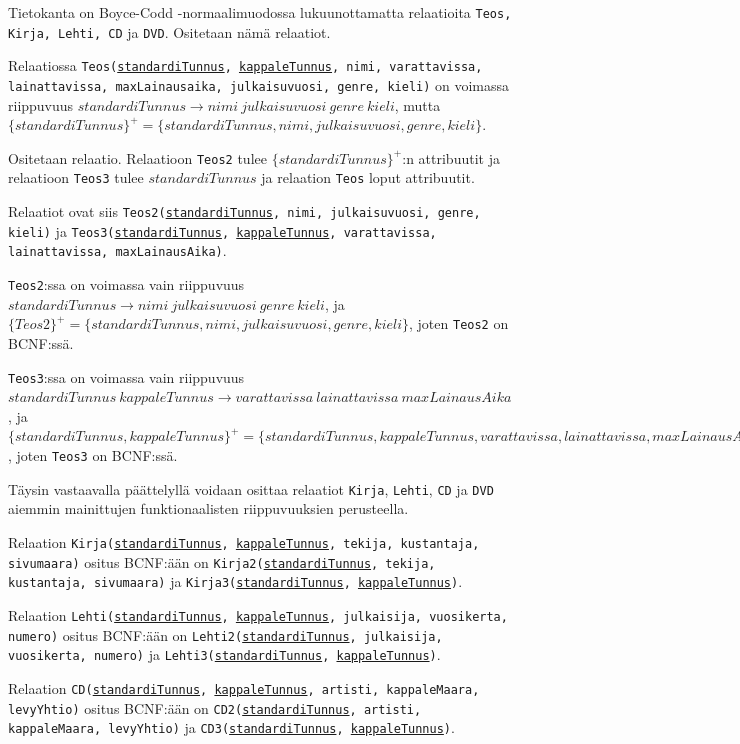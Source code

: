 \documentclass[12pt,titlepage] {article}
\begin{document}
Tietokanta on Boyce-Codd -normaalimuodossa lukuunottamatta relaatioita \texttt{Teos, Kirja, Lehti, CD} ja \texttt{DVD}. Ositetaan nämä relaatiot.

Relaatiossa \texttt{Teos(\underline{standardiTunnus}, \underline{kappaleTunnus}, nimi, varattavissa, lainattavissa, maxLainausaika, julkaisuvuosi, genre, kieli)} on voimassa riippuvuus $standardiTunnus \rightarrow nimi\ julkaisuvuosi\ genre\ kieli$, mutta $\{standardiTunnus\}^+ = \{standardiTunnus, nimi, julkaisuvuosi, genre, kieli\}$.

Ositetaan relaatio. Relaatioon \texttt{Teos2} tulee $\{standardiTunnus\}^+$:n attribuutit ja relaatioon \texttt{Teos3} tulee $standardiTunnus$ ja relaation \texttt{Teos} loput attribuutit.

Relaatiot ovat siis \texttt{Teos2(\underline{standardiTunnus}, nimi, julkaisuvuosi, genre, kieli)} ja \texttt{Teos3(\underline{standardiTunnus}, \underline{kappaleTunnus}, varattavissa, lainattavissa, maxLainausAika)}.

\texttt{Teos2}:ssa on voimassa vain riippuvuus $standardiTunnus \rightarrow nimi\ julkaisuvuosi\ genre\ kieli$, ja $\{Teos2\}^+ = \{standardiTunnus, nimi, julkaisuvuosi, genre, kieli\}$, joten \texttt{Teos2} on BCNF:ssä. 

\texttt{Teos3}:ssa on voimassa vain riippuvuus $standardiTunnus\ kappaleTunnus \rightarrow varattavissa\ lainattavissa\ maxLainausAika$, ja $\{standardiTunnus, kappaleTunnus\}^+ = \{standardiTunnus, kappaleTunnus, varattavissa, lainattavissa, maxLainausAika\}$, joten \texttt{Teos3} on BCNF:ssä.

Täysin vastaavalla päättelyllä voidaan osittaa relaatiot \texttt{Kirja}, \texttt{Lehti}, \texttt{CD} ja \texttt{DVD} aiemmin mainittujen funktionaalisten riippuvuuksien perusteella.

Relaation \texttt{Kirja(\underline{standardiTunnus}, \underline{kappaleTunnus}, tekija, kustantaja, sivumaara)} ositus BCNF:ään on \texttt{Kirja2(\underline{standardiTunnus}, tekija, kustantaja, sivumaara)} ja \texttt{Kirja3(\underline{standardiTunnus}, \underline{kappaleTunnus})}.

Relaation \texttt{Lehti(\underline{standardiTunnus}, \underline{kappaleTunnus}, julkaisija, vuosikerta, numero)} ositus BCNF:ään on \texttt{Lehti2(\underline{standardiTunnus}, julkaisija, vuosikerta, numero)} ja \texttt{Lehti3(\underline{standardiTunnus}, \underline{kappaleTunnus})}.

Relaation \texttt{CD(\underline{standardiTunnus}, \underline{kappaleTunnus}, artisti, kappaleMaara, levyYhtio)} ositus BCNF:ään on \texttt{CD2(\underline{standardiTunnus}, artisti, kappaleMaara, levyYhtio)} ja \texttt{CD3(\underline{standardiTunnus}, \underline{kappaleTunnus})}.
\end{document}
